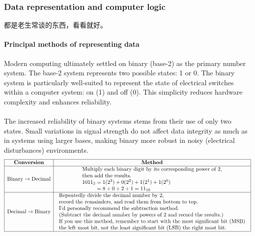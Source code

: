 \documentclass[a4paper,12pt]{article}
\begin{document}
\subsubsection{Data representation and computer logic}
都是老生常谈的东西，看看就好。
\paragraph{Principal methods of representing data}
Modern computing ultimately settled on binary (base-2) as the primary number system. The base-2 system represents two possible states: 1 or 0. The binary system is particularly well-suited to represent the state of electrical switches within a computer system: on (1) and off (0). This simplicity reduces hardware complexity and enhances reliability. \\\\
The increased reliability of binary systems stems from their use of only two states. Small 
variations in signal strength do not affect data integrity as much as in systems using larger bases, making binary more robust in noisy (electrical disturbances) environments. 
\[
\begin{array}{|c|c|}
\hline
\textbf{Conversion} & \textbf{Method} \\ \hline

\text{Binary} \rightarrow \text{Decimal}
&
\begin{array}{l}
\text{Multiply each binary digit by its corresponding power of }2,\\
\text{then add the results.}\\
1011_2 = 1(2^3)+0(2^2)+1(2^1)+1(2^0)\\
\phantom{1011_2}=8+0+2+1=11_{10}
\end{array}
\\ \hline

\text{Decimal} \rightarrow \text{Binary}
&
\begin{array}{l}
\text{Repeatedly divide the decimal number by }2,\\
\text{record the remainders, and read them from bottom to top.}\\
\text{I'd personally recommend the subtraction method.}\\
\text{(Subtract the decimal number by powers of 2 and record the results.)}\\
\text{If you use this method, remember to start with the most significant bit (MSB)}\\\text{the left most bit, not the least significant bit (LSB) the right most bit. }
\end{array}
\\ \hline

\end{array}
\]
\end{document}
